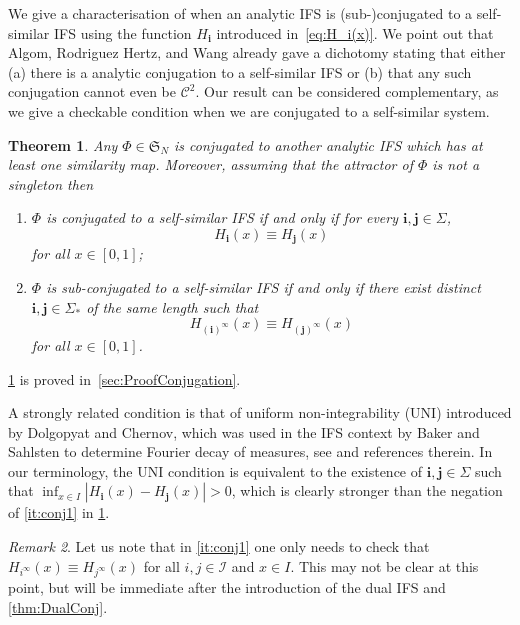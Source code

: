 \documentclass[11pt,a4paper]{article}
\def\cref#1{\ref{#1}}%
\newtheorem{theorem}{Theorem}[section]
\theoremstyle{definition}
\theoremstyle{remark}
\newtheorem{remark}[theorem]{Remark}
\newcommand{\0}{\mathbf{0}}
\newcommand{\bi}{\mathbf{i}}
\newcommand{\bj}{\mathbf{j}}
\numberwithin{equation}{section}
\begin{document}
We give a characterisation of when an analytic IFS is (sub-)conjugated to a self-similar IFS using
the function $H_{\bi}$ introduced in~\cref{eq:H_i(x)}. We point out that Algom, Rodriguez
Hertz, and Wang \cite[Claim 6.1]{AlgomHertzWang23} already gave a dichotomy stating that 
either (a) there is a analytic conjugation to a self-similar IFS or (b) that any such conjugation
cannot even be $\mathcal{C}^2$. Our result can be considered
complementary, as we give a checkable condition when we are conjugated to a self-similar system.

\begin{theorem}\label{thm:SubConjugation}
  Any $\Phi\in\mathfrak{S}_N$ is conjugated to another analytic IFS which has at least one similarity map. 
  Moreover, assuming that the attractor of $\Phi$ is not a singleton then 
  \begin{enumerate}[label=(\alph*)]
    \item\label{it:conj1} $\Phi$ is conjugated to a self-similar IFS if and only if for every
      $\bi,\bj\in\Sigma$,
      \[
	H_{\bi}(x) \equiv H_{\bj}(x)
      \]
      for all $x\in[0,1]$;
    \item\label{it:conj2} $\Phi$ is sub-conjugated to a self-similar IFS if and only if there exist
      distinct $\bi,\bj\in\Sigma_*$
      of the same length such that 
      \[
	H_{(\bi)^\infty}(x) \equiv H_{(\bj)^\infty}(x)
      \]
      for all $x\in[0,1]$.
  \end{enumerate}
\end{theorem}
\cref{thm:SubConjugation} is proved in~\cref{sec:ProofConjugation}.

A strongly related condition is that of uniform non-integrability (UNI) introduced by
Dolgopyat and Chernov, which was used in the IFS context by Baker and Sahlsten to determine Fourier
decay of measures, see \cite{BakerSahlsten23} and references therein.
In our terminology, the UNI condition is equivalent to the existence of 
$\bi,\bj\in\Sigma$ such that 
$\inf_{x\in I} |H_{\bi}(x) -H_{\bj}(x)| >0$, which is clearly stronger than the negation of
\cref{it:conj1} in \cref{thm:SubConjugation}.


\begin{remark}
  Let us note that in \cref{it:conj1} one only needs to check that $H_{i^\infty}(x)\equiv
  H_{j^\infty}(x)$ for all $i,j \in\mathcal{I}$ and $x\in I$.
  This may not be clear at this point, but will be immediate after the introduction of the dual IFS
  and \cref{thm:DualConj}.
\end{remark}
\end{document}
